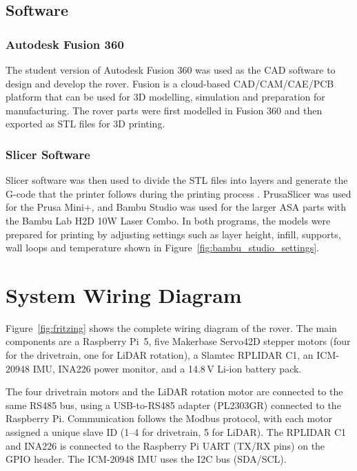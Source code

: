 \subsection{Software}

\subsubsection{Autodesk Fusion 360}

The student version of Autodesk Fusion 360 was used as the CAD software to design and develop the rover. Fusion is a cloud-based CAD/CAM/CAE/PCB platform that can be used for 3D modelling, simulation and preparation for manufacturing. The rover parts were first modelled in Fusion 360 and then exported as STL files for 3D printing.

\subsubsection{Slicer Software}

Slicer software was then used to divide the STL files into layers and generate the G-code that the printer follows during the printing process \cite{BambuLabASA}. PrusaSlicer was used for the Prusa Mini+, and Bambu Studio was used for the larger ASA parts with the Bambu Lab H2D 10W Laser Combo. In both programs, the models were prepared for printing by adjusting settings such as layer height, infill, supports, wall loops and temperature shown in Figure~\ref{fig:bambu_studio_settings}.



\newpage
\section{System Wiring Diagram}
\label{sec:wiring}

Figure~\ref{fig:fritzing} shows the complete wiring diagram of the rover. 
The main components are a Raspberry Pi~5, five Makerbase Servo42D stepper motors
(four for the drivetrain, one for LiDAR rotation), a Slamtec RPLIDAR C1, an ICM-20948 IMU, INA226 power monitor, and a 14.8\,V Li-ion battery pack.

The four drivetrain motors and the LiDAR rotation motor are connected to the same RS485 bus, using a USB-to-RS485 adapter (PL2303GR) connected to the Raspberry Pi. 
Communication follows the Modbus protocol, with each motor assigned a unique slave ID (1–4 for drivetrain, 5 for LiDAR). 
The RPLIDAR C1 and INA226 is connected to the Raspberry Pi UART (TX/RX pins) on the GPIO header. The ICM-20948 IMU uses the I2C bus (SDA/SCL).

